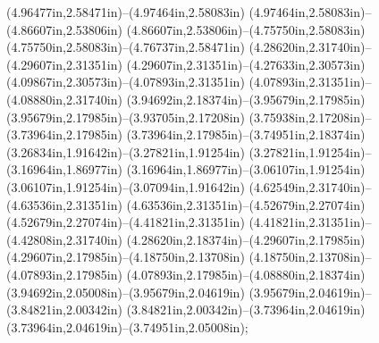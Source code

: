 (4.96477in,2.58471in)--(4.97464in,2.58083in) (4.97464in,2.58083in)--(4.86607in,2.53806in) (4.86607in,2.53806in)--(4.75750in,2.58083in) (4.75750in,2.58083in)--(4.76737in,2.58471in) (4.28620in,2.31740in)--(4.29607in,2.31351in) (4.29607in,2.31351in)--(4.27633in,2.30573in) (4.09867in,2.30573in)--(4.07893in,2.31351in) (4.07893in,2.31351in)--(4.08880in,2.31740in) (3.94692in,2.18374in)--(3.95679in,2.17985in) (3.95679in,2.17985in)--(3.93705in,2.17208in) (3.75938in,2.17208in)--(3.73964in,2.17985in) (3.73964in,2.17985in)--(3.74951in,2.18374in) (3.26834in,1.91642in)--(3.27821in,1.91254in) (3.27821in,1.91254in)--(3.16964in,1.86977in) (3.16964in,1.86977in)--(3.06107in,1.91254in) (3.06107in,1.91254in)--(3.07094in,1.91642in) (4.62549in,2.31740in)--(4.63536in,2.31351in) (4.63536in,2.31351in)--(4.52679in,2.27074in) (4.52679in,2.27074in)--(4.41821in,2.31351in) (4.41821in,2.31351in)--(4.42808in,2.31740in) (4.28620in,2.18374in)--(4.29607in,2.17985in) (4.29607in,2.17985in)--(4.18750in,2.13708in) (4.18750in,2.13708in)--(4.07893in,2.17985in) (4.07893in,2.17985in)--(4.08880in,2.18374in) (3.94692in,2.05008in)--(3.95679in,2.04619in) (3.95679in,2.04619in)--(3.84821in,2.00342in) (3.84821in,2.00342in)--(3.73964in,2.04619in) (3.73964in,2.04619in)--(3.74951in,2.05008in);
